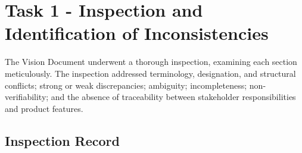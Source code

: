 \documentclass[11pt,a4paper]{article}
\begin{document}
\section{Task 1 - Inspection and Identification of Inconsistencies}

The Vision Document underwent a thorough inspection, examining each section meticulously. The inspection addressed terminology, designation, and structural conflicts; strong or weak discrepancies; ambiguity; incompleteness; non-verifiability; and the absence of traceability between stakeholder responsibilities and product features.

\subsection{Inspection Record}
\end{document}
